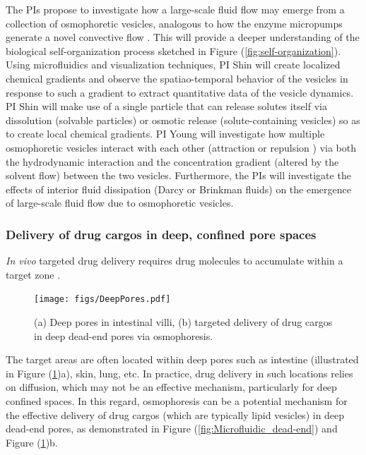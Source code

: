 \documentclass[11pt]{article}
\begin{document}
The PIs propose to investigate how a large-scale fluid flow may emerge from a collection of 
osmophoretic vesicles, analogous to how the enzyme micropumps generate a novel convective flow \cite{Ortiz-Rivera2016_PNAS}.
This will provide a deeper understanding of the biological self-organization process sketched in Figure (\ref{fig:self-organization}). 
Using microfluidics and visualization techniques, PI Shin will create localized chemical gradients and observe the spatiao-temporal 
behavior of the vesicles in response to such a gradient to extract quantitative data of the vesicle dynamics. PI Shin will make use 
of a single particle that can release solutes itself via dissolution (solvable particles) or osmotic release (solute-containing vesicles) 
so as to create local chemical gradients.  PI Young will investigate how multiple osmophoretic vesicles interact with each other (attraction or repulsion \cite{Janssen2012_SoftMatt}) 
via both the hydrodynamic interaction and the concentration gradient (altered by the solvent flow) between the two vesicles.
Furthermore, the PIs will investigate the effects of interior fluid dissipation (Darcy or Brinkman fluids)  on the emergence of
large-scale fluid flow due to osmophoretic vesicles. 

\subsubsection{Delivery of drug cargos in deep, confined pore spaces\label{subsubsec:delivery_drug_cargos}}
{\it In vivo} targeted drug delivery requires drug molecules to accumulate within a target zone \cite{bae2011}. 
\begin{figure}
\vspace*{-13pt}
\centerline{\texttt{[image: figs/DeepPores.pdf]}}
\vspace*{-11pt}
\caption{\footnotesize (a) Deep pores in intestinal villi, (b) targeted delivery of drug cargos in deep dead-end pores via osmophoresis.}
\label{fig:DeepPores}
\end{figure}
The target areas are often located within deep pores such as intestine (illustrated in Figure (\ref{fig:DeepPores})a), skin, lung, etc. In practice, 
drug delivery in such locations relies on diffusion, which may not be an effective mechanism, particularly for deep 
confined spaces. In this regard, osmophoresis can be a potential mechanism for the effective delivery of drug 
cargos (which are typically lipid vesicles) in deep dead-end pores, as demonstrated in Figure (\ref{fig:Microfluidic_dead-end}) and Figure (\ref{fig:DeepPores})b. 
\end{document}
